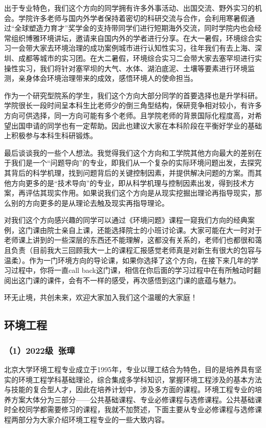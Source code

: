 \documentclass[11pt,oneside]{book}
\begin{document}
出于专业特色，我们这个方向的同学拥有许多外事活动、出国交流、野外实习的机会。学院许多老师与国内外学者保持着密切的科研交流与合作，会利用寒暑假通过“全球塑造力育才”奖学金的支持带同学们进行短期海外交流，同时学院内也会经常组织博雅环境讲坛，邀请来自国内外的学者进行分享。在大一暑假，环境综合实习一会带大家去环境治理的成功案例城市进行认知性实习，往年我们有去上海、深圳、成都等城市的实习团。在大二暑假，环境综合实习二会带大家去塞罕坝进行实操性实习，我们将针对塞罕坝的大气、水体、湖泊底泥、土壤等要素进行环境监测，亲身体会环境治理带来的成效，感悟环境人的使命担当。

作为一个研究型院系的学生，我们这个方向大部分同学的首要选择也是升学科研。学院很长一段时间呈本科生比老师少的倒三角型结构，保研竞争相对较小，有许多方向可供选择，同一方向可能有多个老师。且学院老师的背景国际化程度高，对希望出国申请的同学也有一定帮助。因此也建议大家在本科阶段在平衡好学业的基础上积极参与本科生科研锻炼。

最后谈谈我的一些个人想法。我觉得我们这个方向和工学院其他方向最大的差别在于我们是一个“问题导向”的专业，即我们从一个复杂的实际环境问题出发，去探究其背后的科学机理，找到问题背后的关键控制因素，并提供解决问题的方案。而其他方向更多的是“技术导向”的专业，即从科学机理与控制因素出发，得到技术方案，再评估其现实作用。如果说我们这个方向是从现实挖掘出理论再指导现实，那么别的方向更多的是从理论去触及现实再指导理论。

对我们这个方向感兴趣的同学可以通过《环境问题》课程一窥我们方向的经典案例，这门课由院士亲自上课，还能选择院士的小班讨论课。大家可能在大一时对于老师课上讲到的一些深层的东西还不能理解，这都没有关系的，老师们也都很和蔼且负责（目前我大三回顾我大一上的课程汇报感觉老师真是对新生有很大的包容与温柔）。作为一门环境方向的导论课，如果你选择了这个方向，在接下来几年的学习过程中，你将一直call back这门课，相信在你后面的学习过程中在有所触动时翻阅出这门课的课件，会有不一样的感受，再次感悟到这门课的底蕴与魅力。

环无止境，共创未来，欢迎大家加入我们这个温暖的大家庭！

\subsection{环境工程}

\subsubsection{（1）2022级\ 张璋}

北京大学环境工程专业成立于1995年，专业以理工结合为特色，目的是培养具有坚实的环境工程学科基础理论，综合集成多学科知识，掌握环境工程涉及的基本方法与技能的复合型人才，因此在培养计划中，涉及多方面的课程。环境工程专业的培养方案大体分为三部分——公共基础课程、专业必修课程与选修课程。公共基础课时全校同学都需要修习的课程，我就不加赘述，下面主要从专业必修课程与选修课程两部分为大家介绍环境工程专业的一些大致内容。
\end{document}
